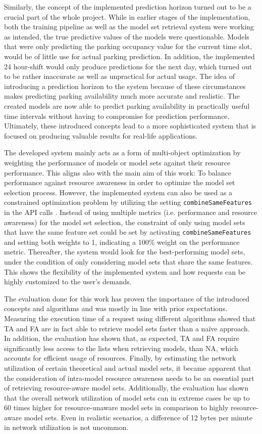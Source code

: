 Similarly, the concept of the implemented prediction horizon turned out to be a crucial part of the whole project. While in earlier stages of the implementation, both the training pipeline as well as the model set retrieval system were working as intended, the true predictive values of the models were questionable. Models that were only predicting the parking occupancy value for the current time slot, would be of little use for actual parking prediction. In addition, the implemented 24 hour-shift would only produce predictions for the next day, which turned out to be rather inaccurate as well as unpractical for actual usage. The idea of introducing a prediction horizon to the system because of these circumstances makes predicting parking availability much more accurate and realistic. The created models are now able to predict parking availability in practically useful time intervals without having to compromise for prediction performance. Ultimately, these introduced concepts lead to a more sophisticated system that is focused on producing valuable results for real-life applications.

The developed system mainly acts as a form of multi-object optimization by weighting the performance of models or model sets against their resource performance. This aligns also with the main aim of this work: To balance performance against resource awareness in order to optimize the model set selection process. However, the implemented system can also be used as a constrained optimization problem by utilizing the setting \texttt{combineSameFeatures} in the API calls \cite{feurer2019}. Instead of using multiple metrics (i.e. performance and resource awareness) for the model set selection, the constraint of only using model sets that have the same feature set could be set by activating \texttt{combineSameFeatures} and setting both weights to 1, indicating a 100\% weight on the performance metric. Thereafter, the system would look for the best-performing model sets, under the condition of only considering model sets that share the same features. This shows the flexibility of the implemented system and how requests can be highly customized to the user's demands.

The evaluation done for this work has proven the importance of the introduced concepts and algorithms and was mostly in line with prior expectations. Measuring the execution time of a request using different algorithms showed that TA and FA are in fact able to retrieve model sets faster than a naïve approach. In addition, the evaluation has shown that, as expected, TA and FA require significantly less access to the lists when retrieving models, than NA, which accounts for efficient usage of resources. Finally, by estimating the network utilization of certain theoretical and actual model sets, it became apparent that the consideration of intra-model resource awareness needs to be an essential part of retrieving resource-aware model sets. Additionally, the evaluation has shown that the overall network utilization of model sets can in extreme cases be up to 60 times higher for resource-unaware model sets in comparison to highly resource-aware model sets. Even in realistic scenarios, a difference of 12 bytes per minute in network utilization is not uncommon.

